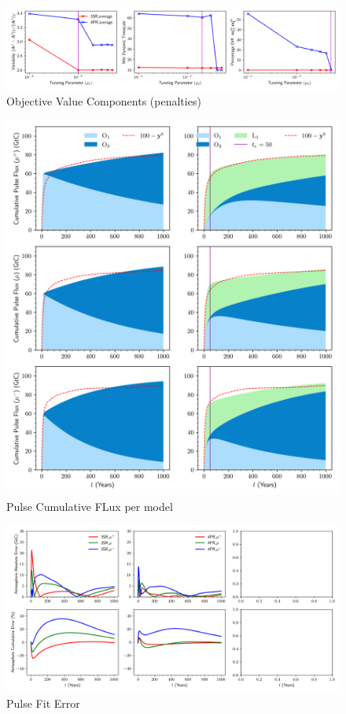 \documentclass[11pt, a4paper, pdftex, twoside, dvipsnames]{article}
\begin{document}
\begin{figure}[b]
    \centering
    \includegraphics[width=\textwidth]{fig/analyse_pen.png}
    \caption{Objective Value Components (penalties) }
\end{figure}


\begin{figure}
    \centering
    \includegraphics[width=\textwidth]{fig/analyse_cum_flux_flux.png}
    \caption{Pulse Cumulative FLux per model}
    \label{fig:selection_best}
\end{figure}


\begin{figure}
    \centering
    \includegraphics[width=\textwidth]{fig/analyse_err.png}
    \caption{Pulse Fit Error}
    \label{fig:selection_best}
\end{figure}
\end{document}
